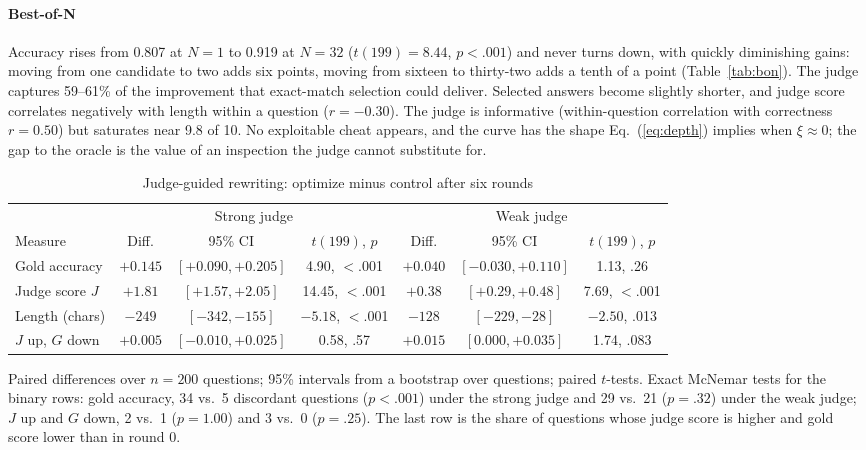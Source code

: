 \documentclass[acmsmall,screen,review]{acmart}
\theoremstyle{acmdefinition}
\begin{document}
\paragraph{Best-of-N} Accuracy rises from 0.807 at $N = 1$ to 0.919 at $N = 32$ ($t(199) = 8.44$, $p < .001$) and never turns down, with quickly diminishing gains: moving from one candidate to two adds six points, moving from sixteen to thirty-two adds a tenth of a point (Table~\ref{tab:bon}). The judge captures 59--61\% of the improvement that exact-match selection could deliver. Selected answers become slightly shorter, and judge score correlates negatively with length within a question ($r = -0.30$). The judge is informative (within-question correlation with correctness $r = 0.50$) but saturates near 9.8 of 10. No exploitable cheat appears, and the curve has the shape Eq.~(\ref{eq:depth}) implies when $\xi \approx 0$; the gap to the oracle is the value of an inspection the judge cannot substitute for.

\begin{table}[t]
\caption{Judge-guided rewriting: optimize minus control after six rounds}\label{tab:rewrite}
\small
\begin{tabular}{@{}lcccccc@{}}
\toprule
 & \multicolumn{3}{c}{Strong judge} & \multicolumn{3}{c}{Weak judge} \\
\cmidrule(lr){2-4}\cmidrule(l){5-7}
Measure & Diff. & 95\% CI & $t(199)$, $p$ & Diff. & 95\% CI & $t(199)$, $p$ \\
\midrule
Gold accuracy & $+0.145$ & $[+0.090, +0.205]$ & 4.90, $<$.001 & $+0.040$ & $[-0.030, +0.110]$ & 1.13, .26 \\
Judge score $J$ & $+1.81$ & $[+1.57, +2.05]$ & 14.45, $<$.001 & $+0.38$ & $[+0.29, +0.48]$ & 7.69, $<$.001 \\
Length (chars) & $-249$ & $[-342, -155]$ & $-5.18$, $<$.001 & $-128$ & $[-229, -28]$ & $-2.50$, .013 \\
$J$ up, $G$ down & $+0.005$ & $[-0.010, +0.025]$ & 0.58, .57 & $+0.015$ & $[0.000, +0.035]$ & 1.74, .083 \\
\bottomrule
\end{tabular}
\par\smallskip\footnotesize Paired differences over $n = 200$ questions; 95\% intervals from a bootstrap over questions; paired $t$-tests. Exact McNemar tests for the binary rows: gold accuracy, 34 vs.\ 5 discordant questions ($p < .001$) under the strong judge and 29 vs.\ 21 ($p = .32$) under the weak judge; $J$ up and $G$ down, 2 vs.\ 1 ($p = 1.00$) and 3 vs.\ 0 ($p = .25$). The last row is the share of questions whose judge score is higher and gold score lower than in round 0.
\end{table}
\end{document}
